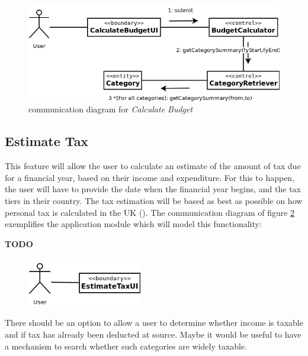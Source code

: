 \begin{figure}[ht!]
  \begin{center}
    \includegraphics[width=14cm]{./contents/img/Comm_Diagram_-_Calculate_Budget.png}
  \end{center}
  \caption{communication diagram for \emph{Calculate Budget}}
  \label{fig:CommDiagram.CalculateBudget}
\end{figure}
\FloatBarrier



\subsection{Estimate Tax} \label{sec:AnalysisAndDesign.EstimateTax}

This feature will allow the user to calculate an estimate of the amount of tax
due for a financial year, based on their income and expenditure. For this to
happen, the user will have to provide the date when the financial year begins,
and the tax tiers in their country. The tax estimation will be based as best as
possible on how personal tax is calculated in the UK
(\cite[][]{hmrc2018personaltax}). The communication diagram
of figure \ref{fig:CommDiagram.EstimateTax} exemplifies the application module
which will model this functionality:

\textbf{TODO}

\begin{figure}[ht!]
  \begin{center}
    \includegraphics[width=5cm]{./contents/img/Comm_Diagram_-_Estimate_Tax.png}
  \end{center}
  \caption{}
  \label{fig:CommDiagram.EstimateTax}
\end{figure}
\FloatBarrier

There should be an option to allow a user to determine whether income is
taxable and if tax has already been deducted at source. Maybe it would be
useful to have a mechanism to search whether such categories are widely
taxable.
